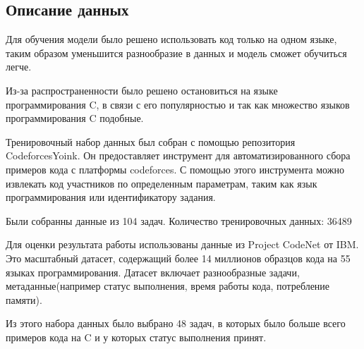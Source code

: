 \documentclass[../part_2.tex]{subfiles}
\begin{document}
    \subsection{Описание данных}
    \par Для обучения модели было решено использовать код только на одном языке, таким образом уменьшится разнообразие в данных и модель сможет обучиться легче.
    \par Из-за распространенности было решено остановиться на языке программирования C, в связи с его популярностью и так как множество языков программирования C подобные.
    \par Тренировочный набор данных был собран с помощью репозитория CodeforcesYoink. Он предоставляет инструмент для автоматизированного сбора примеров кода с платформы codeforces. С помощью этого инструмента можно извлекать код участников по определенным параметрам, таким как язык программирования или идентификатору задания.
    \par Были собранны данные из 104 задач. Количество тренировочных данных: 36489
    \par Для оценки результата работы использованы данные из Project CodeNet\cite{puri2021codenetlargescaleaicode} от IBM. Это масштабный датасет, содержащий более 14 миллионов образцов кода на 55 языках программирования. Датасет включает разнообразные задачи, метаданные(например статус выполнения, время работы кода, потребление памяти).
    \par Из этого набора данных было выбрано 48 задач, в которых было больше всего примеров кода на C и у которых статус выполнения принят.
\end{document}
